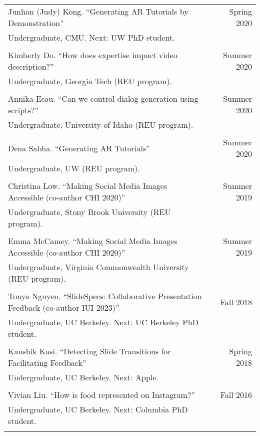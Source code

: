 \begin{longtable}{Xr}
	Junhan (Judy) Kong. ``Generating AR Tutorials by Demonstration'' & Spring 2020 \\
	Undergraduate, CMU. Next: UW PhD student. &  \\
	\\

	Kimberly Do. ``How does expertise impact video description?'' & Summer 2020 \\
	Undergraduate, Georgia Tech (REU program). &  \\
	\\

	Annika Esau. ``Can we control dialog generation using scripts?'' & Summer 2020 \\
	Undergraduate, University of Idaho (REU program). &  \\
	\\

	Dena Sabha. ``Generating AR Tutorials'' & Summer 2020 \\
	Undergraduate, UW (REU program). &  \\
	\\

	Christina Low. ``Making Social Media Images Accessible (co-author CHI 2020)'' & Summer 2019 \\
	Undergraduate, Stony Brook University (REU program). &  \\
	\\

	Emma McCamey. ``Making Social Media Images Accessible (co-author CHI 2020)'' & Summer 2019 \\
	Undergraduate, Virginia Commonwealth University (REU program). &  \\
	\\

	Tonya Nguyen. ``SlideSpecs: Collaborative Presentation Feedback (co-author IUI 2023)'' & Fall 2018 \\
	Undergraduate, UC Berkeley. Next: UC Berkeley PhD student. &  \\
	\\

	Kaushik Kasi. ``Detecting Slide Transitions for Facilitating Feedback'' & Spring 2018 \\
	Undergraduate, UC Berkeley. Next: Apple. &  \\
	\\

	Vivian Liu. ``How is food represented on Instagram?'' & Fall 2016 \\
	Undergraduate, UC Berkeley. Next: Columbia PhD student. &  \\
	\\

\end{longtable}